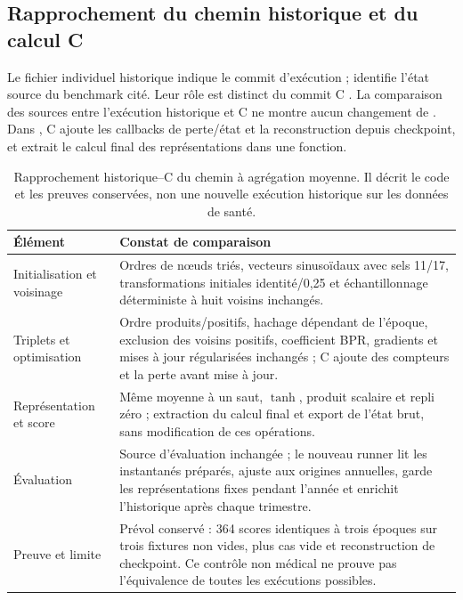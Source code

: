 \subsection{Rapprochement du chemin historique et du calcul C}

Le fichier individuel historique indique le commit d'exécution  ;  identifie l'état source du benchmark cité. Leur rôle est distinct du commit C . La comparaison des sources entre l'exécution historique et C ne montre aucun changement de . Dans , C ajoute les callbacks de perte/état et la reconstruction depuis checkpoint, et extrait le calcul final des représentations dans une fonction.

\begin{table}[!htbp]\centering\footnotesize
\caption{Rapprochement historique--C du chemin à agrégation moyenne. Il décrit le code et les preuves conservées, non une nouvelle exécution historique sur les données de santé.}
\begin{tabularx}{\linewidth}{@{}p{34mm}X@{}}
\toprule
Élément & Constat de comparaison\\
\midrule
Initialisation et voisinage & Ordres de nœuds triés, vecteurs sinusoïdaux avec sels 11/17, transformations initiales identité/0,25 et échantillonnage déterministe à huit voisins inchangés.\\
Triplets et optimisation & Ordre produits/positifs, hachage dépendant de l'époque, exclusion des voisins positifs, coefficient BPR, gradients et mises à jour régularisées inchangés ; C ajoute des compteurs et la perte avant mise à jour.\\
Représentation et score & Même moyenne à un saut, $\tanh$, produit scalaire et repli zéro ; extraction du calcul final et export de l'état brut, sans modification de ces opérations.\\
Évaluation & Source d'évaluation inchangée ; le nouveau runner lit les instantanés préparés, ajuste aux origines annuelles, garde les représentations fixes pendant l'année et enrichit l'historique après chaque trimestre.\\
Preuve et limite & Prévol conservé : 364 scores identiques à trois époques sur trois fixtures non vides, plus cas vide et reconstruction de checkpoint. Ce contrôle non médical ne prouve pas l'équivalence de toutes les exécutions possibles.\\
\bottomrule
\end{tabularx}
\end{table}


